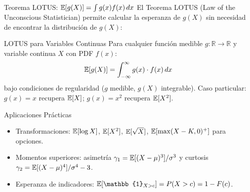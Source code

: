 \documentclass[10pt, aspectratio=169]{beamer}
\begin{document}
\begin{frame}{Teorema LOTUS: $\mathbb{E}[g(X)] = \int g(x) f(x)\,dx$}
  \footnotesize
  El Teorema LOTUS (Law of the Unconscious Statistician) permite calcular la esperanza de $g(X)$ sin necesidad de encontrar la distribución de $g(X)$: \pause

  \vspace{0.1cm}
  \begin{block}{LOTUS para Variables Continuas}
    Para cualquier función medible $g: \mathbb{R} \to \mathbb{R}$ y variable continua $X$ con PDF $f(x)$:
    $$\mathbb{E}[g(X)] = \int_{-\infty}^{\infty} g(x) \cdot f(x)\,dx$$
    bajo condiciones de regularidad ($g$ medible, $g(X)$ integrable). Caso particular: $g(x) = x$ recupera $\mathbb{E}[X]$; $g(x) = x^{2}$ recupera $\mathbb{E}[X^{2}]$.
  \end{block}

  \vspace{0.1cm}
  \pause
  \begin{alertblock}{Aplicaciones Prácticas}
    \begin{itemize}\itemsep=0.05cm
      \item Transformaciones: $\mathbb{E}[\log X]$, $\mathbb{E}[X^{2}]$, $\mathbb{E}[\sqrt{X}]$, $\mathbb{E}[\max(X - K, 0)^{+}]$ para opciones.
      \item Momentos superiores: asimetría $\gamma_{1} = \mathbb{E}[(X-\mu)^{3}]/\sigma^{3}$ y curtosis $\gamma_{2} = \mathbb{E}[(X-\mu)^{4}]/\sigma^{4} - 3$.
      \item Esperanza de indicadores: $\E[\mathbb{1}_{X > c}] = P(X > c) = 1 - F(c)$.
    \end{itemize}
  \end{alertblock}
\end{frame}
\end{document}
